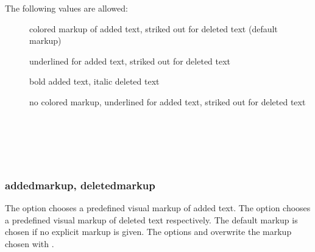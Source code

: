 The following values are allowed:
\begin{description}
	\item [] colored markup of added text, striked out for deleted text (default markup)
	\item [] underlined for added text, striked out for deleted text
	\item [] bold added text, italic deleted text
	\item [] no colored markup, underlined for added text, striked out for deleted text
\end{description}

\begin{chusage}
		\>\\
	\usageexample
		\> \Corresponds\ \\
		\>\\
		\>\\
		\>
\end{chusage}


\subsubsection{addedmarkup, deletedmarkup}

The  option chooses a predefined visual markup of added text.
The  option chooses a predefined visual markup of deleted text respectively.
The default markup is chosen if no explicit markup is given.
The options  and  overwrite the markup chosen with .

